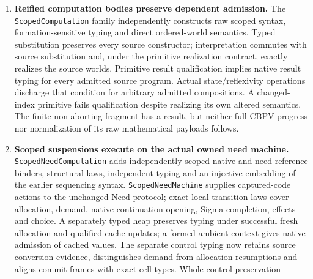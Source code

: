\documentclass[11pt]{article}
\theoremstyle{definition}
\theoremstyle{remark}
\begin{document}
\begin{enumerate}
  \nolinkurl{ContextualDependentSequencing} proves the exact handler law for
  sequencing, including selected state, branch history and ordered intents.
  \nolinkurl{FormationSensitiveDependentComputation} constructs actual native
  dependent pairs, commutes with native value substitution, and rejects a
  wrong selected identity index. \nolinkurl{NeedDependentService} proves
  first and cached consumer runs of the existing owned machine, with full
  request-index validation and exact execution-answer erasure.
  \nolinkurl{NativeConversionNeedConsumer} connects the actual finite checker
  to those runs, independently formed logical admission and effectful
  dependent use. These are qualified components, not a completed
  object-language CBPV calculus or C realization; the scoped source's
  whole-control invariant is established separately below.
\item \textbf{Reified computation bodies preserve dependent admission.}
  The \nolinkurl{ScopedComputation} family independently constructs raw scoped
  syntax, formation-sensitive typing and direct ordered-world semantics.
  Typed substitution preserves every source constructor; interpretation
  commutes with source substitution and, under the primitive realization
  contract, exactly realizes the source worlds.
  Primitive result qualification implies native result typing for every
  admitted source program. Actual state/reflexivity operations discharge
  that condition for arbitrary admitted compositions. A changed-index
  primitive fails qualification despite realizing its own altered semantics.
  The finite non-aborting fragment has a result, but neither full CBPV
  progress nor normalization of its raw mathematical payloads follows.
\item \textbf{Scoped suspensions execute on the actual owned need machine.}
  \nolinkurl{ScopedNeedComputation} adds independently scoped native and
  need-reference binders, structural laws, independent typing and an
  injective embedding of the earlier sequencing syntax.
  \nolinkurl{ScopedNeedMachine} supplies captured-code actions to the
  unchanged Need protocol; exact local transition laws cover allocation,
  demand, native continuation opening, Sigma completion, effects and choice.
  A separately typed heap preserves typing under successful fresh allocation
  and qualified cache updates; a formed ambient context gives native
  admission of cached values. The separate control typing now retains source
  conversion evidence, distinguishes demand from allocation resumptions and
  aligns commit frames with exact cell types. Whole-control preservation

\end{enumerate}
\end{document}
